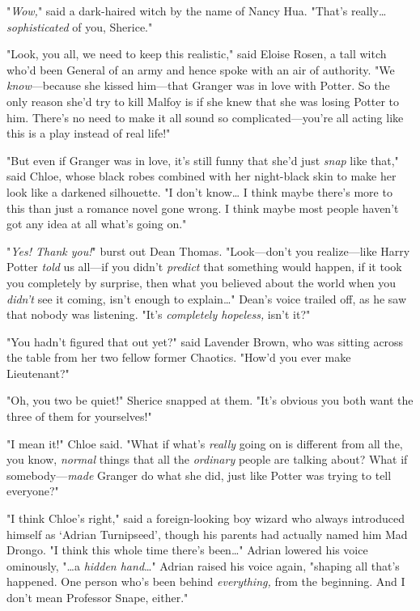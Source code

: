 "\emph{Wow,}" said a dark-haired witch by the name of Nancy Hua. "That's
really{\ldots} \emph{sophisticated} of you, Sherice."

"Look, you all, we need to keep this realistic," said Eloise Rosen, a tall
witch who'd been General of an army and hence spoke with an air of authority.
"We \emph{know}---because she kissed him---that Granger was in love with
Potter. So the only reason she'd try to kill Malfoy is if she knew that she was
losing Potter to him. There's no need to make it all sound so
complicated---you're all acting like this is a play instead of real life!"

"But even if Granger was in love, it's still funny that she'd just \emph{snap}
like that," said Chloe, whose black robes combined with her night-black skin to
make her look like a darkened silhouette. "I don't know{\ldots} I think maybe
there's more to this than just a romance novel gone wrong. I think maybe most
people haven't got any idea at all what's going on."

"\emph{Yes! Thank you!}" burst out Dean Thomas. "Look---don't you
realize---like Harry Potter \emph{told} us all---if you didn't \emph{predict}
that something would happen, if it took you completely by surprise, then what
you believed about the world when you \emph{didn't} see it coming, isn't enough
to explain{\ldots}" Dean's voice trailed off, as he saw that nobody was
listening. "It's \emph{completely hopeless,} isn't it?"

"You hadn't figured that out yet?" said Lavender Brown, who was sitting across
the table from her two fellow former Chaotics. "How'd you ever make Lieutenant?"

"Oh, you two be quiet!" Sherice snapped at them. "It's obvious you both want
the three of them for yourselves!"

"I mean it!" Chloe said. "What if what's \emph{really} going on is different
from all the, you know, \emph{normal} things that all the \emph{ordinary}
people are talking about? What if somebody---\emph{made} Granger do what she
did, just like Potter was trying to tell everyone?"

"I think Chloe's right," said a foreign-looking boy wizard who always
introduced himself as `Adrian Turnipseed', though his parents had actually
named him Mad Drongo. "I think this whole time there's been{\ldots}" Adrian
lowered his voice ominously, "{\ldots}a \emph{hidden hand}{\ldots}" Adrian
raised his voice again, "shaping all that's happened. One person who's been
behind \emph{everything,} from the beginning. And I don't mean Professor Snape,
either."

